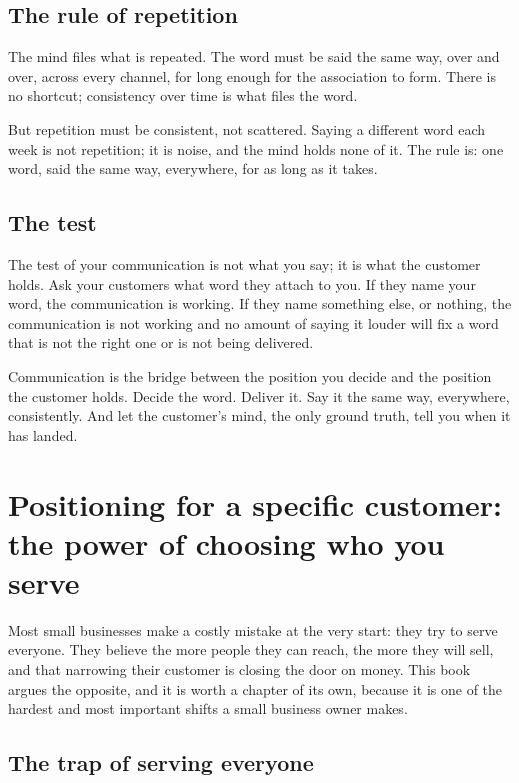 \documentclass[10pt,twoside,openany]{memoir}
\newcommand{\needspacehead}{\needspace{4\baselineskip}}
\let\oldsection\section
\renewcommand{\section}{\needspacehead\oldsection}
\begin{document}
\section{The rule of repetition}\label{the-rule-of-repetition}

The mind files what is repeated. The word must be said the same way,
over and over, across every channel, for long enough for the association
to form. There is no shortcut; consistency over time is what files the
word.

But repetition must be consistent, not scattered. Saying a different
word each week is not repetition; it is noise, and the mind holds none
of it. The rule is: one word, said the same way, everywhere, for as long
as it takes.

\section{The test}\label{the-test}

The test of your communication is not what you say; it is what the
customer holds. Ask your customers what word they attach to you. If they
name your word, the communication is working. If they name something
else, or nothing, the communication is not working and no amount of
saying it louder will fix a word that is not the right one or is not
being delivered.

Communication is the bridge between the position you decide and the
position the customer holds. Decide the word. Deliver it. Say it the
same way, everywhere, consistently. And let the customer's mind, the
only ground truth, tell you when it has landed.

\FloatBarrier
\chapter{Positioning for a specific customer: the power of choosing who
you
serve}\label{positioning-for-a-specific-customer-the-power-of-choosing-who-you-serve}

Most small businesses make a costly mistake at the very start: they try
to serve everyone. They believe the more people they can reach, the more
they will sell, and that narrowing their customer is closing the door on
money. This book argues the opposite, and it is worth a chapter of its
own, because it is one of the hardest and most important shifts a small
business owner makes.

\section{The trap of serving
everyone}\label{the-trap-of-serving-everyone}
\end{document}
